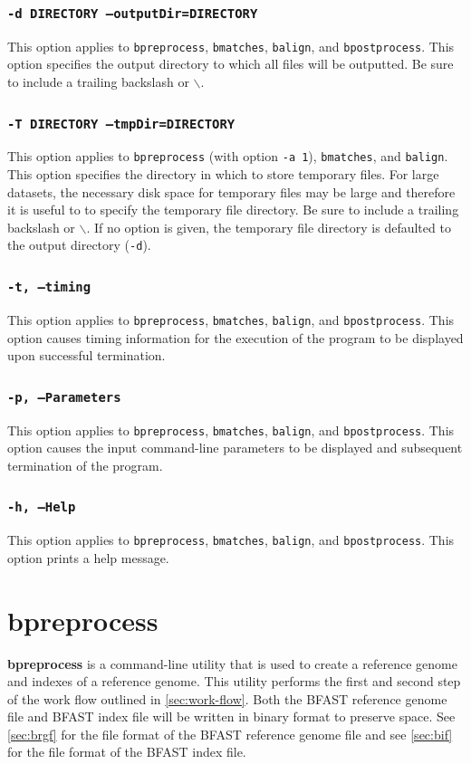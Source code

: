 \documentclass[a4paper,12pt]{book}
\newcommand{\TT}[1]{{\tt #1}} %
\newcommand{\BF}[1]{{\bf #1}} %
\newcommand{\BRGF}{BFAST reference genome file} %
\newcommand{\BIF}{BFAST index file} %
\begin{document}
\subsubsection{\TT{-d DIRECTORY --outputDir=DIRECTORY}}
This option applies to \TT{bpreprocess}, \TT{bmatches}, \TT{balign}, and \TT{bpostprocess}.
This option specifies the output directory to which all files will be outputted.
Be sure to include a trailing backslash or $\backslash$.

\subsubsection{\TT{-T DIRECTORY --tmpDir=DIRECTORY}}
This option applies to \TT{bpreprocess} (with option \TT{-a 1}), \TT{bmatches}, and \TT{balign}.
This option specifies the directory in which to store temporary files.
For large datasets, the necessary disk space for temporary files may be large and therefore it is useful to to specify the temporary file directory. 
Be sure to include a trailing backslash or $\backslash$.
If no option is given, the temporary file directory is defaulted to the output directory (\TT{-d}).

\subsubsection{\TT{-t, --timing}}
This option applies to \TT{bpreprocess}, \TT{bmatches}, \TT{balign}, and \TT{bpostprocess}.
This option causes timing information for the execution of the program to be displayed upon successful termination.

\subsubsection{\TT{-p, --Parameters}}
This option applies to \TT{bpreprocess}, \TT{bmatches}, \TT{balign}, and \TT{bpostprocess}.
This option causes the input command-line parameters to be displayed and subsequent termination of the program.

\subsubsection{\TT{-h, --Help}}
This option applies to \TT{bpreprocess}, \TT{bmatches}, \TT{balign}, and \TT{bpostprocess}.
This option prints a help message.

\section{bpreprocess}
\label{sec:bpreprocess}
\BF{bpreprocess} is a command-line utility that is used to create a reference genome and indexes of a reference genome.
This utility performs the first and second step of the work flow outlined in \autoref{sec:work-flow}.
Both the \BRGF{} and \BIF{} will be written in binary format to preserve space.
See \autoref{sec:brgf} for the file format of the \BRGF{} and see \autoref{sec:bif} for the file format of the \BIF{}.
\end{document}
